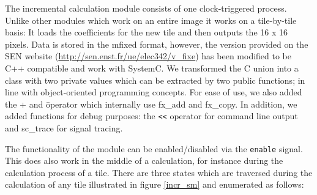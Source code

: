 The incremental calculation module consists of one clock-triggered process. Unlike other modules which work on an entire image it works on a tile-by-tile basis: It loads the coefficients for the new tile and then outputs the 16 x 16 pixels. Data is stored in the mfixed format, however, the version provided on the SEN website (\url{http://sen.enst.fr/ue/elec342/v_fixe}) has been modified to be C++ compatible and work with SystemC. We transformed the C union into a class with two private values which can be extracted by two public functions; in line with object-oriented programming concepts. For ease of use, we also added the + and \= operator which internally use fx\_add and fx\_copy. In addition, we added functions for debug purposes: the \texttt{<}\texttt{<} operator for command line output and sc\_trace for signal tracing.

The functionality of the module can be enabled/disabled via the \texttt{enable} signal. This does also work in the middle of a calculation, for instance during the calculation process of a tile. There are three states which are traversed during the calculation of any tile illustrated in figure \ref{incr_sm} and enumerated as follows:

